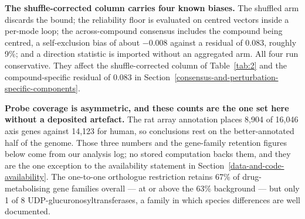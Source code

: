 \documentclass[11pt,a4paper]{article}
\begin{document}
\textbf{The shuffle-corrected column carries four known biases.} The
shuffled arm discards the bound; the reliability floor is evaluated on
centred vectors inside a per-mode loop; the across-compound consensus
includes the compound being centred, a self-exclusion bias of about
−0.008 against a residual of 0.083, roughly 9\%; and a direction
statistic is imported without an aggregated arm. All four run
conservative. They affect the shuffle-corrected column of Table~\ref{tab:2} and
the compound-specific residual of 0.083 in Section~\ref{consensus-and-perturbation-specific-components}.

\textbf{Probe coverage is asymmetric, and these counts are the one set
here without a deposited artefact.} The rat array annotation places
8,904 of 16,046 axis genes against 14,123 for human, so conclusions rest
on the better-annotated half of the genome. Those three numbers and the
gene-family retention figures below come from our analysis log; no
stored computation backs them, and they are the one exception to the
availability statement in Section~\ref{data-and-code-availability}. The one-to-one orthologue
restriction retains 67\% of drug-metabolising gene families overall ---
at or above the 63\% background --- but only 1 of 8
UDP-glucuronosyltransferases, a family in which species differences are
well documented.
\end{document}
